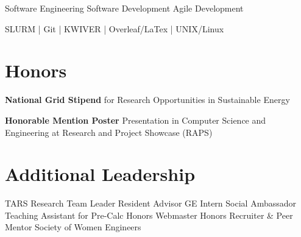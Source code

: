 \documentclass[]{deedy-resume-openfont}
\begin{document}
\begin{minipage}[t]{0.29\textwidth}
\sectionsep
{} \newline
Software Engineering \newline
Software Development \newline
Agile Development %
\sectionsep

 \newline
SLURM | Git | KWIVER |\newline
Overleaf/LaTex |\newline
UNIX/Linux 
\sectionsep


\section{Honors}
\textbf{National Grid Stipend} for Research Opportunities in Sustainable Energy
\sectionsep

\textbf{Honorable Mention Poster} Presentation in Computer Science and Engineering at Research and Project Showcase (RAPS)



\sectionsep


\section{Additional Leadership}
TARS Research Team Leader \newline
Resident Advisor \newline
GE Intern Social Ambassador
Teaching Assistant for Pre-Calc \newline
Honors Webmaster \newline
Honors Recruiter \& Peer Mentor \newline
Society of Women Engineers



\end{minipage} %
\end{document}
